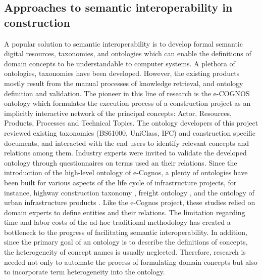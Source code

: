 \documentclass[Journal, BackFigs, DoubleSpace]{ascelike}%
\begin{document}
\subsection{Approaches to semantic interoperability in construction}
A popular solution to semantic interoperability is to develop formal semantic digital resources, taxonomies, and ontologies which can enable the definitions of domain concepts to be understandable to computer systems. A plethora of ontologies, taxonomies have been developed. However, the existing products mostly result from the manual processes of knowledge retrieval, and ontology definition and validation. The pioneer in this line of research is the e-COGNOS ontology \cite{wetherill02,lima05} which formulates the execution process of a construction project as an implicitly interactive network of the principal concepts: Actor, Resources, Products, Processes and Technical Topics. The ontology developers of this project reviewed existing taxonomies (BS61000, UniClass, IFC) and construction specific documents, and interacted with the end users to identify relevant concepts and relations among them. Industry experts were invited to validate the developed ontology through questionnaires on terms used an their relations. Since the introduction of the high-level ontology of e-Cognos, a plenty of ontologies have been built for various aspects of the life cycle of infrastructure projects, for instance, highway construction taxonomy \cite{el-diraby05,el-diraby05b}, freight ontology \cite{seedah15}, and the ontology of urban infrastructure products \cite{osman06}. Like the e-Cognos project, these studies relied on domain experts to define entities and their relations. The limitation regarding time and labor costs of the ad-hoc traditional methodology has created a bottleneck to the progress of facilitating semantic interoperability. In addition, since the primary goal of an ontology is to describe the definitions of concepts, the heterogeneity of concept names is usually neglected. Therefore, research is needed not only to automate the process of formulating domain concepts but also to incorporate term heterogeneity into the ontology.
\par
\end{document}
